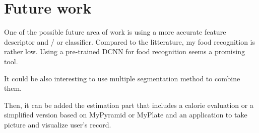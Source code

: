 \chapter{Future work} \label{sec:conclusion}

One of the possible future area of work is using a more accurate feature descriptor and / or classifier. Compared to the litterature, my food recognition is rather low. Using a pre-trained DCNN for food recognition seems a promising tool.

It could be also interesting to use multiple segmentation method to combine them.

Then, it can be added the estimation part that includes a calorie evaluation or a simplified version based on MyPyramid or MyPlate and an application to take picture and visualize user's record.